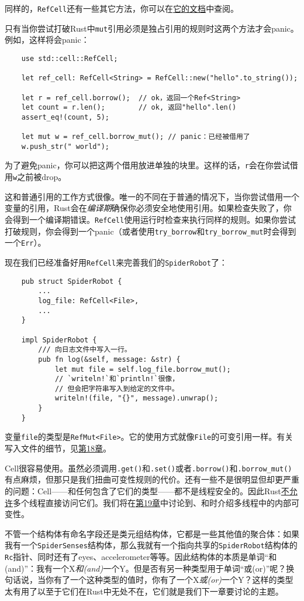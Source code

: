同样的，\texttt{RefCell}还有一些其它方法，你可以在\href{https://doc.rust-lang.org/std/cell/struct.RefCell.html}{它的文档}中查阅。

只有当你尝试打破Rust中\texttt{mut}引用必须是独占引用的规则时这两个方法才会panic。例如，这样将会panic：
\begin{verbatim}
    use std::cell::RefCell;

    let ref_cell: RefCell<String> = RefCell::new("hello".to_string());

    let r = ref_cell.borrow();  // ok，返回一个Ref<String>
    let count = r.len();        // ok, 返回"hello".len()
    assert_eq!(count, 5);       

    let mut w = ref_cell.borrow_mut(); // panic：已经被借用了
    w.push_str(" world");
\end{verbatim}

为了避免panic，你可以把这两个借用放进单独的块里。这样的话，\texttt{r}会在你尝试借用\texttt{w}之前被drop。

这和普通引用的工作方式很像。唯一的不同在于普通的情况下，当你尝试借用一个变量的引用，Rust会在\emph{编译期}确保你必须安全地使用引用。如果检查失败了，你会得到一个编译期错误。\texttt{RefCell}使用运行时检查来执行同样的规则。如果你尝试打破规则，你会得到一个panic（或者使用\texttt{try\_borrow}和\texttt{try\_borrow\_mut}时会得到一个\texttt{Err}）。

现在我们已经准备好用\texttt{RefCell}来完善我们的\texttt{SpiderRobot}了：
\begin{verbatim}
    pub struct SpiderRobot {
        ...
        log_file: RefCell<File>,
        ...
    }

    impl SpiderRobot {
        /// 向日志文件中写入一行。
        pub fn log(&self, message: &str) {
            let mut file = self.log_file.borrow_mut();
            // `writeln!`和`println!`很像，
            // 但会把字符串写入到给定的文件中。
            writeln!(file, "{}", message).unwrap();
        }
    }
\end{verbatim}

变量\texttt{file}的类型是\texttt{RefMut<File>}。它的使用方式就像\texttt{File}的可变引用一样。有关写入文件的细节，见\hyperref[ch18]{第18章}。

Cell很容易使用。虽然必须调用\texttt{.get()}和\texttt{.set()}或者\texttt{.borrow()}和\texttt{.borrow\_mut()}有点麻烦，但那只是我们扭曲可变性规则的代价。还有一些不是很明显但却更严重的问题：Cell——和任何包含了它们的类型——都不是线程安全的。因此Rust\hyperref[threadsafe]{不允许}多个线程直接访问它们。我们将在\hyperref[ch19]{第19章}中讨论到、和时介绍多线程中的内部可变性。

不管一个结构体有命名字段还是类元组结构体，它都是一些其他值的聚合体：如果我有一个\texttt{SpiderSenses}结构体，那么我就有一个指向共享的\texttt{SpiderRobot}结构体的\texttt{Rc}指针、同时还有了eyes、accelerometer等等。因此结构体的本质是单词“和(and)”：我有一个X\emph{和(and)}一个Y。但是否有另一种类型用于单词“或(or)”呢？换句话说，当你有了一个这种类型的值时，你有了一个X\emph{或(or)}一个Y？这样的类型太有用了以至于它们在Rust中无处不在，它们就是我们下一章要讨论的主题。
